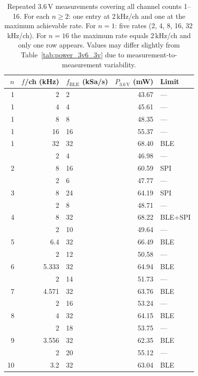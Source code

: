 \begin{table}[htbp]
\centering
\caption{Repeated 3.6\,V measurements covering all channel counts 1--16.
For each $n \ge 2$: one entry at 2\,kHz/ch and one at the maximum achievable
rate. For $n=1$: five rates (2, 4, 8, 16, 32\,kHz/ch). For $n=16$ the maximum
rate equals 2\,kHz/ch and only one row appears.
Values may differ slightly from Table~\ref{tab:power_3v6_3v} due to
measurement-to-measurement variability.}
\label{tab:power_repeat}
\footnotesize
\begin{tabular}{@{}rrlrl@{}}
\toprule
$n$ & $f$/ch (kHz) & $f_\text{BLE}$ (kSa/s) & $P_{3.6\,\text{V}}$ (mW) & Limit \\
\midrule
 1 &  2      &  2 & 43.67 & ---     \\
 1 &  4      &  4 & 45.61 & ---     \\
 1 &  8      &  8 & 48.35 & ---     \\
 1 & 16      & 16 & 55.37 & ---     \\
 1 & 32      & 32 & 68.40 & BLE     \\
\addlinespace
 2 &  2      &  4 & 46.98 & ---     \\
 2 &  8      & 16 & 60.59 & SPI     \\
\addlinespace
 3 &  2      &  6 & 47.77 & ---     \\
 3 &  8      & 24 & 64.19 & SPI     \\
\addlinespace
 4 &  2      &  8 & 48.71 & ---     \\
 4 &  8      & 32 & 68.22 & BLE+SPI \\
\addlinespace
 5 &  2      & 10 & 49.64 & ---     \\
 5 &  6.4    & 32 & 66.49 & BLE     \\
\addlinespace
 6 &  2      & 12 & 50.58 & ---     \\
 6 &  5.333  & 32 & 64.94 & BLE     \\
\addlinespace
 7 &  2      & 14 & 51.73 & ---     \\
 7 &  4.571  & 32 & 63.76 & BLE     \\
\addlinespace
 8 &  2      & 16 & 53.24 & ---     \\
 8 &  4      & 32 & 64.15 & BLE     \\
\addlinespace
 9 &  2      & 18 & 53.75 & ---     \\
 9 &  3.556  & 32 & 62.35 & BLE     \\
\addlinespace
10 &  2      & 20 & 55.12 & ---     \\
10 &  3.2    & 32 & 63.04 & BLE     \\

\end{tabular}
\end{table}
